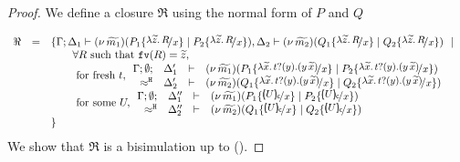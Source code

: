 \begin{proof}
	\noi We define a closure $\Re$ using the normal form of $P$ and $Q$

	\[
		\begin{array}{rcll}
			\Re &=& \set{\horel{\Gamma}{\Delta_1}{\newsp{\widetilde{m_1}}{P_1 \subst{\abs{\widetilde{z}}{R}}{x} \Par P_2 \subst{\abs{\widetilde{z}}{R}}{x}}}{,}{\Delta_2}{\newsp{\widetilde{m_2}}{Q_1 \subst{\abs{\widetilde{z}}{R}}{x} \Par Q_2 \subst{\abs{\widetilde{z}}{R}}{x}}} \setbar \\
			&& \qquad \forall R \textrm{ such that } \fv{R} = \widetilde{z},\\
			&& \qquad \textrm{ for fresh } t,
			\mhorel{\Gamma}{\Delta_1'}
			{\newsp{\widetilde{m_1}}{P_1 \subst{\auxtr{t}}{x} \Par P_2 \subst{\auxtr{t}}{x}}}
			{\hwb}
			{\Delta_2'}{}{\newsp{\widetilde{m_2}}{Q_1 \subst{\auxtr{t}}{x} \Par Q_2 \subst{\auxtr{t}}{x}}}\\
			&& \qquad \textrm{ for some } U, 
			\mhorel{\Gamma}{\Delta_1''}
			{\newsp{\widetilde{m_1}}{P_1 \subst{\omapchar{U}}{x} \Par P_2 \subst{\omapchar{U}}{x}}}
			{\hwb}
			{\Delta_2''}{}{\newsp{\widetilde{m_2}}{Q_1 \subst{\omapchar{U}}{x} \Par Q_2 \subst{\omapchar{U}}{x}}} \\
			&&}
		\end{array}
	\]
%
%
	\noi We show that $\Re$ is a bisimulation up to \betatran ().


\end{proof}
